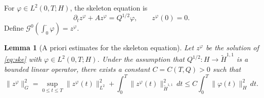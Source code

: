 \documentclass[11pt,a4paper,reqno]{amsart}
\newtheorem{lemma}[theorem]{Lemma}
\theoremstyle{definition}
\begin{document}
For \(\varphi\in L^2(0,T;H)\), the skeleton equation is
\begin{equation}\label{eq:ske}
  \partial_t z^\varphi + A z^\varphi = Q^{1/2}\varphi,\qquad z^\varphi(0)=0 .
\end{equation}
Define \(\mathcal G^0(\int_0^\cdot \varphi) = z^\varphi\).

\begin{lemma}[A priori estimates for the skeleton equation]\label{lem:energy}
  Let $z^\varphi$ be the solution of \eqref{eq:ske} with $\varphi\in L^2(0,T;H)$.
  Under the assumption that $Q^{1/2}:H\to\widetilde H^{1,1}$ is a bounded linear operator,
  there exists a constant $C=C(T,Q)>0$ such that
  \[
    \|z^\varphi\|_{G}^2
    = \sup_{0\le t\le T}\|z^\varphi(t)\|_{L^2}^2
      + \int_0^T \|z^\varphi(t)\|_{\widetilde H^{1,1}}^2\,dt
    \le C \int_0^T \|\varphi(t)\|_{H}^2\,dt .
  \]
\end{lemma}
\end{document}
